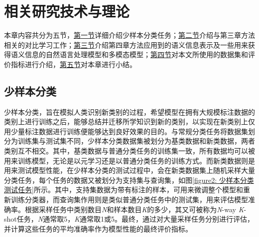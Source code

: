 \chapter[\hspace{0pt}相关研究技术与理论]{{\heiti{}\hspace{0pt}相关研究技术与理论}}

\removelofgap
\removelotgap

本章内容共分为五节，\hyperref[section2: 少样本分类]{第一节}详细介绍少样本分类任务；\hyperref[section2: 对比学习]{第二节}介绍与第三章方法相关的对比学习工作；\hyperref[section2: 语义信息表示]{第三节}介绍第四章方法应用到的语义信息表示及一些用来获得语义信息的自然语言处理模型和多模态模型；\hyperref[section2: 数据集及评价指标]{第四节}对本文所使用的数据集和评价指标进行介绍，\hyperref[section2: 本章小结]{第五节}对本章进行小结。

\section[\hspace{-2pt}少样本分类]{{\heiti{} \hspace{-8pt}少样本分类}}\label{section2: 少样本分类}

少样本分类，旨在模拟人类识别新类别的过程，希望模型在拥有大规模标注数据的类别上进行训练之后，能够总结并迁移所学知识到新的类别，以实现在新类别上仅用少量标注数据进行训练便能够达到良好效果的目的。与常规分类任务将数据集划分为训练集与测试集不同，少样本分类数据集被划分为基类数据和新类数据，两者类别互不相交。其中，基类数据与普通分类任务的训练集一致，所有数据均可以被用来训练模型，无论是以元学习还是以普通分类任务的训练方式。而新类数据则是用来测试模型性能，在少样本分类的测试过程中，会在新类数据集上随机采样大量分类任务，每个任务的数据又被划分为支持集与查询集，如图\ref{figure2: 少样本分类测试任务}所示。其中，支持集数据为带有标注的样本，可用来微调整个模型和重新训练分类器，而查询集作用则是类似普通分类任务中的测试集，用来评估模型准确率。根据采样任务中类别数目\emph{N}和样本数目\emph{K}的多少，其又可被称为\emph{N}-way \emph{K}-shot任务，\emph{N}通常取5，\emph{K}通常取1或5。最终，通过对大量采样任务分别进行评估，并计算这些任务的平均准确率作为模型性能的最终评价指标。

